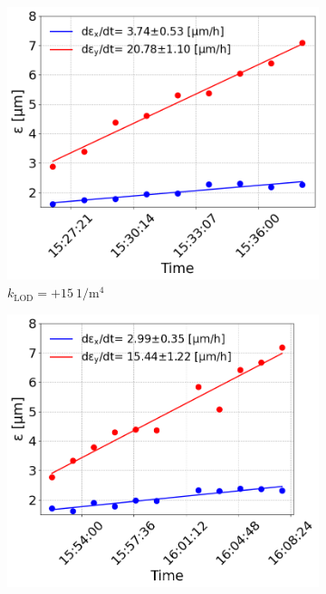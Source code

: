 \begin{figure}[htp]
   \centering
   \begin{subfigure}{.45\textwidth}
       \centering
       \includegraphics[width=.95\linewidth]{images/Ch8/emit_vs_time_Set1_coast6.png}  
       \caption{$k_\mathrm{LOD}=+15 \ \mathrm{1/m^{4}}$}
       \label{fig:cc_md_2022_coast6}
   \end{subfigure}
   \begin{subfigure}{.45\textwidth}
       \centering
       \includegraphics[width=.95\linewidth]{images/Ch8/emit_vs_time_Set1_coast7.png}  

\end{subfigure}
\end{figure}
